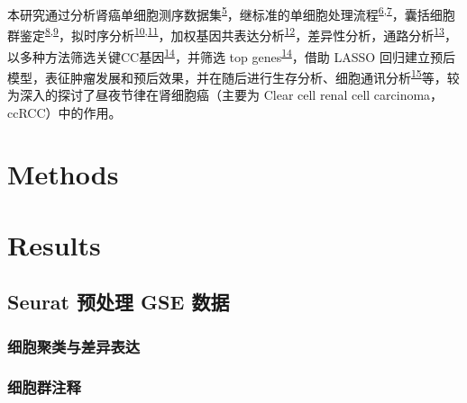 \documentclass[
]{article}
\begin{document}
本研究通过分析肾癌单细胞测序数据集\textsuperscript{\protect\hyperlink{ref-IntegrativeSinYuZh2023}{5}}，继标准的单细胞处理流程\textsuperscript{\protect\hyperlink{ref-IntegratedAnalHaoY2021}{6},\protect\hyperlink{ref-ComprehensiveIStuart2019}{7}}，囊括细胞群鉴定\textsuperscript{\protect\hyperlink{ref-SupervisedClasPliner2019}{8},\protect\hyperlink{ref-ReferenceBasedAran2019}{9}}，拟时序分析\textsuperscript{\protect\hyperlink{ref-ReversedGraphQiuX2017}{10},\protect\hyperlink{ref-TheDynamicsAnTrapne2014}{11}}，加权基因共表达分析\textsuperscript{\protect\hyperlink{ref-WgcnaAnRPacLangfe2008}{12}}，差异性分析，通路分析\textsuperscript{\protect\hyperlink{ref-ClusterprofilerWuTi2021}{13}}，以多种方法筛选关键CC基因\textsuperscript{\protect\hyperlink{ref-EfsAnEnsemblNeuman2017}{14}}，并筛选 top genes\textsuperscript{\protect\hyperlink{ref-EfsAnEnsemblNeuman2017}{14}}，借助 LASSO 回归建立预后模型，表征肿瘤发展和预后效果，并在随后进行生存分析、细胞通讯分析\textsuperscript{\protect\hyperlink{ref-InferenceAndAJinS2021}{15}}等，较为深入的探讨了昼夜节律在肾细胞癌（主要为 Clear cell renal cell carcinoma，ccRCC）中的作用。

\hypertarget{methods}{%
\section{Methods}\label{methods}}

\hypertarget{results}{%
\section{Results}\label{results}}

\hypertarget{seurat-ux9884ux5904ux7406-gse-ux6570ux636e}{%
\subsection{Seurat 预处理 GSE 数据}\label{seurat-ux9884ux5904ux7406-gse-ux6570ux636e}}

\hypertarget{ux7ec6ux80deux805aux7c7bux4e0eux5deeux5f02ux8868ux8fbe}{%
\subsubsection{细胞聚类与差异表达}\label{ux7ec6ux80deux805aux7c7bux4e0eux5deeux5f02ux8868ux8fbe}}

\hypertarget{ux7ec6ux80deux7fa4ux6ce8ux91ca}{%
\subsubsection{细胞群注释}\label{ux7ec6ux80deux7fa4ux6ce8ux91ca}}
\end{document}
